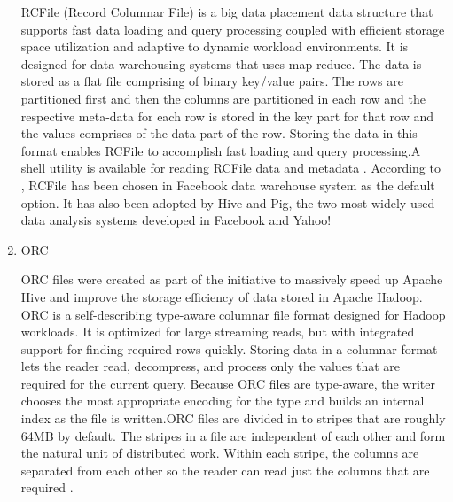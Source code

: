\begin{enumerate}
RCFile (Record Columnar File) \label{\detokenize{i524/technologies:id486}}{\hyperref[\detokenize{i524/technologies:www-rcfile}]{\sphinxcrossref{{[}418{]}}}} is a big
data placement data structure that supports fast data loading and
query processing coupled with efficient storage space utilization
and adaptive to dynamic workload environments. It is designed for
data warehousing systems that uses map-reduce. The data is stored
as a flat file comprising of binary key/value pairs. The rows are
partitioned first and then the columns are partitioned in each
row and the respective meta-data for each row is stored in the
key part for that row and the values comprises of the data part
of the row. Storing the data in this format enables RCFile to
accomplish fast loading and query processing.A shell utility is
available for reading RCFile data and metadata
\label{\detokenize{i524/technologies:id487}}{\hyperref[\detokenize{i524/technologies:www-rcfile}]{\sphinxcrossref{{[}418{]}}}}. According to \label{\detokenize{i524/technologies:id488}}{\hyperref[\detokenize{i524/technologies:he2011rcfile}]{\sphinxcrossref{{[}419{]}}}}, RCFile has
been chosen in Facebook data warehouse system as the default
option. It has also been adopted by Hive and Pig, the two most
widely used data analysis systems developed in Facebook and
Yahoo!

\item {} 
ORC

ORC files were created as part of the initiative to massively
speed up Apache Hive and improve the storage efficiency of data
stored in Apache Hadoop. ORC is a self-describing type-aware
columnar file format designed for Hadoop workloads. It is
optimized for large streaming reads, but with integrated support
for finding required rows quickly. Storing data in a columnar
format lets the reader read, decompress, and process only the
values that are required for the current query. Because ORC files
are type-aware, the writer chooses the most appropriate encoding
for the type and builds an internal index as the file is
written.ORC files are divided in to stripes that are roughly 64MB
by default. The stripes in a file are independent of each other
and form the natural unit of distributed work. Within each
stripe, the columns are separated from each other so the reader
can read just the columns that are required \label{\detokenize{i524/technologies:id489}}{\hyperref[\detokenize{i524/technologies:www-orc-docs}]{\sphinxcrossref{{[}420{]}}}}.


\end{enumerate}

